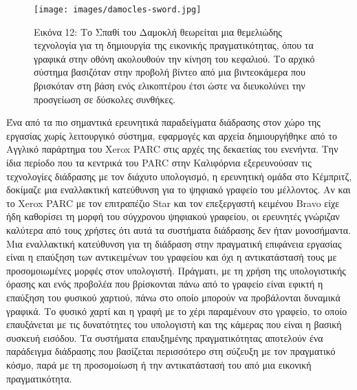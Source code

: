 \documentclass[
]{article}
\begin{document}
\leavevmode{}%
\begin{figure}
\hypertarget{fig:damocles-sword}{%
\centering
\texttt{[image: images/damocles-sword.jpg]}
\caption{Εικόνα 12: Tο Σπαθί του Δαμοκλή θεωρείται μια θεμελιώδης
τεχνολογία για τη δημιουργία της εικονικής πραγματικότητας, όπου τα
γραφικά στην οθόνη ακολουθούν την κίνηση του κεφαλιού. Το αρχικό σύστημα
βασιζόταν στην προβολή βίντεο από μια βιντεοκάμερα που βρισκόταν στη
βάση ενός ελικοπτέρου έτσι ώστε να διευκολύνει την προσγείωση σε
δύσκολες συνθήκες.}\label{fig:damocles-sword}
}
\end{figure}

Ένα από τα πιο σημαντικά ερευνητικά παραδείγματα διάδρασης στον χώρο της
εργασίας χωρίς λειτουργικό σύστημα, εφαρμογές και αρχεία δημιουργήθηκε
από το Αγγλικό παράρτημα του Xerox PARC στις αρχές της δεκαετίας του
ενενήντα. Την ίδια περίοδο που τα κεντρικά του PARC στην Καλιφόρνια
εξερευνούσαν τις τεχνολογίες διάδρασης με τον διάχυτο υπολογισμό, η
ερευνητική ομάδα στο Κέμπριτζ, δοκίμαζε μια εναλλακτική κατεύθυνση για
το ψηφιακό γραφείο του μέλλοντος. Αν και το Xerox PARC με τον
επιτραπέζιο Star και τον επεξεργαστή κειμένου Bravo είχε ήδη καθορίσει
τη μορφή του σύγχρονου ψηφιακού γραφείου, οι ερευνητές γνώριζαν καλύτερα
από τους χρήστες ότι αυτά τα συστήματα διάδρασης δεν ήταν μονοσήμαντα.
Μια εναλλακτική κατεύθυνση για τη διάδραση στην πραγματική επιφάνεια
εργασίας είναι η επαύξηση των αντικειμένων του γραφείου και όχι η
αντικατάστασή τους με προσομοιωμένες μορφές στον υπολογιστή. Πράγματι,
με τη χρήση της υπολογιστικής όρασης και ενός προβολέα που βρίσκονται
πάνω από το γραφείο είναι εφικτή η επαύξηση του φυσικού χαρτιού, πάνω
στο οποίο μπορούν να προβάλονται δυναμικά γραφικά. Το φυσικό χαρτί και η
γραφή με το χέρι παραμένουν στο γραφείο, το οποίο επαυξάνεται με τις
δυνατότητες του υπολογιστή και της κάμερας που είναι η βασική συσκευή
εισόδου. Τα συστήματα επαυξημένης πραγματικότητας αποτελούν ένα
παράδειγμα διάδρασης που βασίζεται περισσότερο στη σύζευξη με τον
πραγματικό κόσμο, παρά με τη προσομοίωση ή την αντικατάστασή του από μια
εικονική πραγματικότητα.
\end{document}
